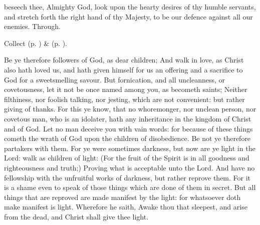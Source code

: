 \collect
{} beseech thee, Almighty God, look upon the hearty desires of thy humble servants, and stretch forth the right hand of thy Majesty, to be our defence against all our enemies. Through.
\begin{rubric}
     Collect  (p. \pageref{AshWednesdayMassCollect}) \&   (p. \pageref{SPLivingDeparted}).
\end{rubric}

 Be ye therefore followers of God, as dear children; And walk in love, as Christ also hath loved us, and hath given himself for us an offering and a sacrifice to God for a sweetsmelling savour. But fornication, and all uncleanness, or covetousness, let it not be once named among you, as becometh saints; Neither filthiness, nor foolish talking, nor jesting, which are not convenient: but rather giving of thanks. For this ye know, that no whoremonger, nor unclean person, nor covetous man, who is an idolater, hath any inheritance in the kingdom of Christ and of God. Let no man deceive you with vain words: for because of these things cometh the wrath of God upon the children of disobedience. Be not ye therefore partakers with them. For ye were sometimes darkness, but now are ye light in the Lord: walk as children of light: (For the fruit of the Spirit is in all goodness and righteousness and truth;) Proving what is acceptable unto the Lord. And have no fellowship with the unfruitful works of darkness, but rather reprove them. For it is a shame even to speak of those things which are done of them in secret. But all things that are reproved are made manifest by the light: for whatsoever doth make manifest is light. Wherefore he saith, Awake thou that sleepest, and arise from the dead, and Christ shall give thee light.


